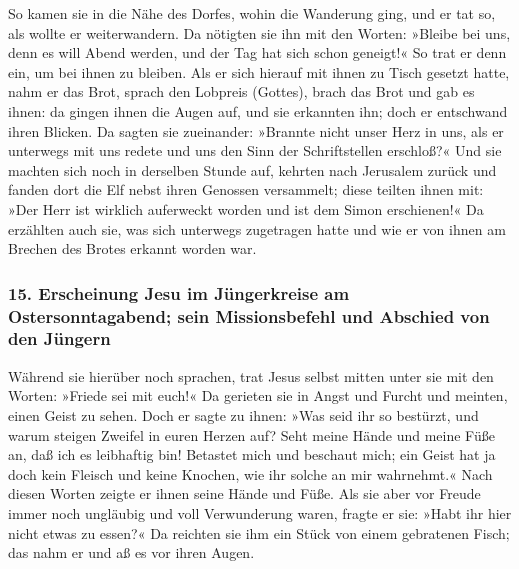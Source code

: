  So kamen sie in die Nähe des Dorfes, wohin die Wanderung
ging, und er tat so, als wollte er weiterwandern.  Da
nötigten sie ihn mit den Worten: »Bleibe bei uns, denn es will Abend
werden, und der Tag hat sich schon geneigt!« So trat er denn ein, um bei
ihnen zu bleiben.  Als er sich hierauf mit ihnen zu Tisch
gesetzt hatte, nahm er das Brot, sprach den Lobpreis (Gottes), brach das
Brot und gab es ihnen:  da gingen ihnen die Augen auf,
und sie erkannten ihn; doch er entschwand ihren Blicken. 
Da sagten sie zueinander: »Brannte nicht unser Herz in uns, als er
unterwegs mit uns redete und uns den Sinn der Schriftstellen erschloß?«
 Und sie machten sich noch in derselben Stunde auf,
kehrten nach Jerusalem zurück und fanden dort die Elf nebst ihren
Genossen versammelt;  diese teilten ihnen mit: »Der Herr
ist wirklich auferweckt worden und ist dem Simon erschienen!«
 Da erzählten auch sie, was sich unterwegs zugetragen
hatte und wie er von ihnen am Brechen des Brotes erkannt worden war.

\hypertarget{erscheinung-jesu-im-juxfcngerkreise-am-ostersonntagabend-sein-missionsbefehl-und-abschied-von-den-juxfcngern}{%
\subsubsection{15. Erscheinung Jesu im Jüngerkreise am
Ostersonntagabend; sein Missionsbefehl und Abschied von den
Jüngern}\label{erscheinung-jesu-im-juxfcngerkreise-am-ostersonntagabend-sein-missionsbefehl-und-abschied-von-den-juxfcngern}}

 Während sie hierüber noch sprachen, trat Jesus selbst
mitten unter sie mit den Worten: »Friede sei mit euch!« 
Da gerieten sie in Angst und Furcht und meinten, einen Geist zu sehen.
 Doch er sagte zu ihnen: »Was seid ihr so bestürzt, und
warum steigen Zweifel in euren Herzen auf?  Seht meine
Hände und meine Füße an, daß ich es leibhaftig bin! Betastet mich und
beschaut mich; ein Geist hat ja doch kein Fleisch und keine Knochen, wie
ihr solche an mir wahrnehmt.«  Nach diesen Worten zeigte
er ihnen seine Hände und Füße.  Als sie aber vor Freude
immer noch ungläubig und voll Verwunderung waren, fragte er sie:
 »Habt ihr hier nicht etwas zu essen?« Da reichten sie
ihm ein Stück von einem gebratenen Fisch;  das nahm er
und aß es vor ihren Augen.

